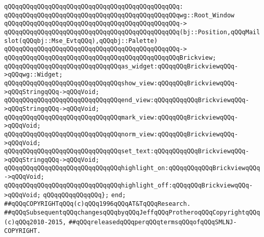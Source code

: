 \verb|qQQqqQQqqQQqqQQqqQQqqQQqqQQqqQQqqQQqqQQqqQQqqQQq:|\newline
\verb|qQQqqQQqqQQqqQQqqQQqqQQqqQQqqQQqqQQqqQQqqQQqqQQqwg::Root_Window|\newline
\verb|qQQqqQQqqQQqqQQqqQQqqQQqqQQqqQQqqQQqqQQqqQQqqQQq->|\newline
\verb|qQQqqQQqqQQqqQQqqQQqqQQqqQQqqQQqqQQqqQQqqQQqqQQq(bj::Position,qQQqMailslot(qQQqbj::Mse_EvtqQQq),qQQqbj::Palette)|\newline
\verb|qQQqqQQqqQQqqQQqqQQqqQQqqQQqqQQqqQQqqQQqqQQqqQQq->|\newline
\verb|qQQqqQQqqQQqqQQqqQQqqQQqqQQqqQQqqQQqqQQqqQQqqQQqBrickview;|\newline
\newline
\verb|qQQqqQQqqQQqqQQqqQQqqQQqqQQqqQQqas_widget:qQQqqQQqBrickviewqQQq->qQQqwg::Widget;|\newline
\newline
\verb|qQQqqQQqqQQqqQQqqQQqqQQqqQQqqQQqshow_view:qQQqqQQqBrickviewqQQq->qQQqStringqQQq->qQQqVoid;|\newline
\verb|qQQqqQQqqQQqqQQqqQQqqQQqqQQqqQQqend_view:qQQqqQQqqQQqBrickviewqQQq->qQQqStringqQQq->qQQqVoid;|\newline
\newline
\verb|qQQqqQQqqQQqqQQqqQQqqQQqqQQqqQQqmark_view:qQQqqQQqBrickviewqQQq->qQQqVoid;|\newline
\verb|qQQqqQQqqQQqqQQqqQQqqQQqqQQqqQQqnorm_view:qQQqqQQqBrickviewqQQq->qQQqVoid;|\newline
\newline
\verb|qQQqqQQqqQQqqQQqqQQqqQQqqQQqqQQqset_text:qQQqqQQqqQQqBrickviewqQQq->qQQqStringqQQq->qQQqVoid;|\newline
\newline
\verb|qQQqqQQqqQQqqQQqqQQqqQQqqQQqqQQqhighlight_on:qQQqqQQqqQQqBrickviewqQQq->qQQqVoid;|\newline
\verb|qQQqqQQqqQQqqQQqqQQqqQQqqQQqqQQqhighlight_off:qQQqqQQqBrickviewqQQq->qQQqVoid;|\newline
\verb|qQQqqQQqqQQqqQQq};|\newline
\newline
\verb|end;|\newline
\verb|##qQQqCOPYRIGHTqQQq(c)qQQq1996qQQqAT&TqQQqResearch.|\newline
\verb|##qQQqSubsequentqQQqchangesqQQqbyqQQqJeffqQQqProtheroqQQqCopyrightqQQq(c)qQQq2010-2015,|\newline
\verb|##qQQqreleasedqQQqperqQQqtermsqQQqofqQQqSMLNJ-COPYRIGHT.|\newline

